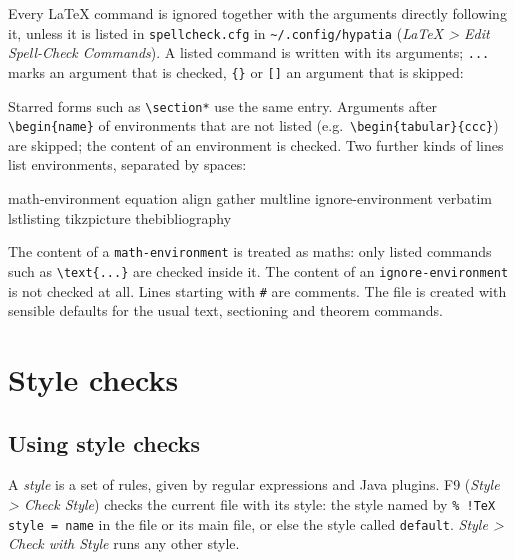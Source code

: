 \documentclass[11pt]{article}
\newcommand{\key}[1]{\textsf{#1}}
\newcommand{\menu}[1]{\textsf{\textit{#1}}}
\newcommand{\file}[1]{\texttt{#1}}
\newcommand{\cfgdir}{\texttt{\textasciitilde/.config/hypatia}}
\begin{document}
    Every LaTeX command is ignored together with the arguments directly following it, unless it is listed in \file{spellcheck.cfg} in \cfgdir{} (\menu{LaTeX > Edit Spell-Check Commands}). A listed command is written with its arguments; \verb+...+ marks an argument that is checked, \verb+{}+ or \verb+[]+ an argument that is skipped:
    Starred forms such as \verb+\section*+ use the same entry. Arguments after \verb+\begin{name}+ of environments that are not listed (e.g.\ \verb+\begin{tabular}{ccc}+) are skipped; the content of an environment is checked. Two further kinds of lines list environments, separated by spaces:
    \begin{Code}
math-environment equation align gather multline
ignore-environment verbatim lstlisting tikzpicture thebibliography
    \end{Code}
    The content of a \verb+math-environment+ is treated as maths: only listed commands such as \verb+\text{...}+ are checked inside it. The content of an \verb+ignore-environment+ is not checked at all. Lines starting with \verb+#+ are comments. The file is created with sensible defaults for the usual text, sectioning and theorem commands.


    \section{Style checks}\label{sec:style}

    \subsection{Using style checks}

    A \emph{style} is a set of rules, given by regular expressions and Java plugins. \key{F9} (\menu{Style > Check Style}) checks the current file with its style: the style named by \verb+% !TeX style = name+ in the file or its main file, or else the style called \verb+default+. \menu{Style > Check with Style} runs any other style.
\end{document}
